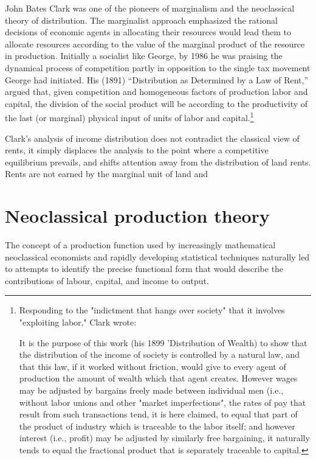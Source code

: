   
 John Bates Clark was one of the pioneers of marginalism and the neoclassical theory of  distribution.  The marginalist approach emphasized the rational decisions of economic agents in allocating their resources would lead them to allocate resources according to the value of the marginal product of the resource in production.  Initially a socialist like George, by 1986 he was praising the dynamical process of competition partly in opposition to the single tax movement George had initiated.  His (1891) ``Distribution as Determined by a Law of Rent,'' argued that, given  competition and homogeneous factors of production labor and capital, the division of the social product will be according to the productivity of the last (or marginal) physical input of units of labor and capital.\footnote{Responding to the "indictment that hangs over society" that it involves "exploiting labor," Clark wrote:

    It is the purpose of this work (his 1899 'Distribution of Wealth) to show that the distribution of the income of society is controlled by a natural law, and that this law, if it worked without friction, would give to every agent of production the amount of wealth which that agent creates. However wages may be adjusted by bargains freely made between individual men (i.e., without labor unions and other "market imperfections", the rates of pay that result from such transactions tend, it is here claimed, to equal that part of the product of industry which is traceable to the labor itself; and however interest (i.e., profit) may be adjusted by similarly free bargaining, it naturally tends to equal the fractional product that is separately traceable to capital.} 
 
Clark's analysis of income distribution does not contradict the classical view of rents, it simply displaces the analysis to the point where a competitive equilibrium prevails, and shifts attention away from the distribution of land rents. Rents are not earned by the marginal unit of land and  

\section{Neoclassical production theory}
The concept of a production function used by increasingly mathematical neoclassical economists and  rapidly developing statistical techniques  naturally led to attempts to identify the precise functional form that would describe the contributions of labour, capital, and income to output.
 
